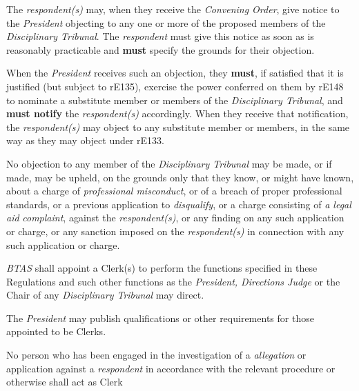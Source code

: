 \par
The \emph{respondent(s)} may, when they receive the \emph{Convening
Order}, give notice to the \emph{President} objecting to any one or more
of the proposed members of the \emph{Disciplinary Tribunal}.
The \emph{respondent }must give this notice as soon as is reasonably
practicable and  \textcolor{myred}{\textbf{must}} specify the grounds for their objection.\\
\par
When the \emph{President} receives such an objection, they  \textcolor{myred}{\textbf{must}}, if
satisfied that it is justified (but subject to rE135), exercise the
power conferred on them by rE148 to nominate a substitute member or
members of the \emph{Disciplinary Tribunal}, and  \textcolor{myred}{\textbf{must notify}}
the \emph{respondent(s)} accordingly. When they receive that
notification, the \emph{respondent(s) }may object to any substitute
member or members, in the same way as they may object under rE133.\\
\par
No objection to any member of the \emph{Disciplinary Tribunal} may be
made, or if made, may be upheld, on the grounds only that they know, or
might have known, about a charge of \emph{professional misconduct}, or
of a breach of proper professional standards, or a previous application
to \emph{disqualify}, or a charge consisting of \emph{a legal
aid} \emph{complaint}, against the \emph{respondent(s)}, or any finding
on any such application or charge, or any sanction imposed on
the \emph{respondent(s)} in connection with any such application or
charge.\\
\par
{}
\emph{BTAS} shall appoint a Clerk(s) to perform the functions specified
in these Regulations and such other functions as the \emph{President,
Directions Judge} or the Chair of any \emph{Disciplinary Tribunal} may
direct.\\
\par
The \emph{President} may publish qualifications or other requirements
for those appointed to be Clerks.\\
\par
No person who has been engaged in the investigation of
a \emph{allegation} or application against a \emph{respondent} in
accordance with the relevant procedure or otherwise shall act as Clerk
